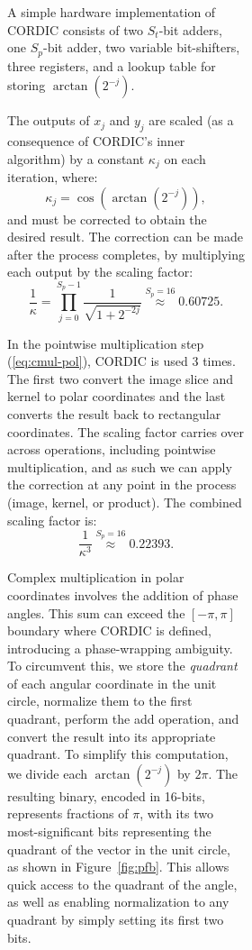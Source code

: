 \begin{figure}[!tb]
\begin{figure}[!tb]
\begin{figure}[!tb]
  A simple hardware implementation of CORDIC consists of two $S_t$-bit adders, one $S_p$-bit adder, two variable bit-shifters, three registers, and a lookup table for storing $\arctan(2^{-j})$.
  
  The outputs of $x_j$ and $y_j$ are scaled (as a consequence of CORDIC's inner algorithm) by a constant $\kappa_j$ on each iteration, where:
  \begin{equation}\label{eq:cordic3}
    \kappa_j = \cos(\arctan(2^{-j})),
  \end{equation}
  and must be corrected to obtain the desired result. The correction can be made after the process completes, by multiplying each output by the scaling factor:
  \begin{equation}\label{eq:cordic4}
    \frac{1}{\kappa} = \prod_{j=0}^{S_p-1}{\frac{1}{\sqrt{1+2^{-2j}}}} \stackrel{S_p=16}{\approx} 0.60725.
  \end{equation}

  In the pointwise multiplication step (\ref{eq:cmul-pol}), CORDIC is used 3 times. The first two convert the image slice and kernel to polar coordinates and the last converts the result back to rectangular coordinates. The scaling factor carries over across operations, including pointwise multiplication, and as such we can apply the correction at any point in the process (image, kernel, or product). The combined scaling factor is:
  \begin{equation}\label{eq:cordic5}
    \frac{1}{\kappa^3} \stackrel{S_p=16}{\approx} 0.22393.
  \end{equation}

  Complex multiplication in polar coordinates involves the addition of phase angles. This sum can exceed the $[-\pi, \pi]$ boundary where CORDIC is defined, introducing a phase-wrapping ambiguity. To circumvent this, we store the \textit{quadrant} of each angular coordinate in the unit circle, normalize them to the first quadrant, perform the add operation, and convert the result into its appropriate quadrant. To simplify this computation, we divide each $\arctan(2^{-j})$ by $2\pi$. The resulting binary, encoded in 16-bits, represents fractions of $\pi$, with its two most-significant bits representing the quadrant of the vector in the unit circle, as shown in Figure~\ref{fig:pfb}. This allows quick access to the quadrant of the angle, as well as enabling normalization to any quadrant by simply setting its first two bits.


\end{figure}
\end{figure}
\end{figure}
